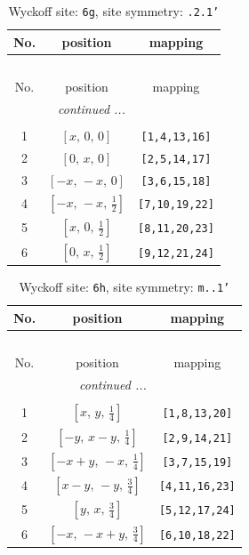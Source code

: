 \documentclass[fleqn,8pt]{jsarticle}
\begin{document}
\renewcommand{\arraystretch}{1.2}
\begin{longtable}{ccc}
\caption{Wyckoff site: {\tt 6g}, site symmetry: {\tt .2.1'}}
 \\
 \hline \hline
No. & position & mapping \\ \hline \endfirsthead

\multicolumn{2}{l}{\tablename\ \thetable{}} \\
 \hline \hline
No. & position & mapping \\ \hline \endhead

 \hline \hline
\multicolumn{2}{r}{\footnotesize\it continued ...} \\ \endfoot

 \hline \hline
\multicolumn{2}{r}{} \\ \endlastfoot

1 & $\left[ x,\, 0,\, 0 \right]$ & {\tt [1,4,13,16]} \\ \hline
2 & $\left[ 0,\, x,\, 0 \right]$ & {\tt [2,5,14,17]} \\ \hline
3 & $\left[ - x,\, - x,\, 0 \right]$ & {\tt [3,6,15,18]} \\ \hline
4 & $\left[ - x,\, - x,\, \frac{1}{2} \right]$ & {\tt [7,10,19,22]} \\ \hline
5 & $\left[ x,\, 0,\, \frac{1}{2} \right]$ & {\tt [8,11,20,23]} \\ \hline
6 & $\left[ 0,\, x,\, \frac{1}{2} \right]$ & {\tt [9,12,21,24]} \\
\end{longtable}
\renewcommand{\arraystretch}{1.2}
\begin{longtable}{ccc}
\caption{Wyckoff site: {\tt 6h}, site symmetry: {\tt m..1'}}
 \\
 \hline \hline
No. & position & mapping \\ \hline \endfirsthead

\multicolumn{2}{l}{\tablename\ \thetable{}} \\
 \hline \hline
No. & position & mapping \\ \hline \endhead

 \hline \hline
\multicolumn{2}{r}{\footnotesize\it continued ...} \\ \endfoot

 \hline \hline
\multicolumn{2}{r}{} \\ \endlastfoot

1 & $\left[ x,\, y,\, \frac{1}{4} \right]$ & {\tt [1,8,13,20]} \\ \hline
2 & $\left[ - y,\, x - y,\, \frac{1}{4} \right]$ & {\tt [2,9,14,21]} \\ \hline
3 & $\left[ - x + y,\, - x,\, \frac{1}{4} \right]$ & {\tt [3,7,15,19]} \\ \hline
4 & $\left[ x - y,\, - y,\, \frac{3}{4} \right]$ & {\tt [4,11,16,23]} \\ \hline
5 & $\left[ y,\, x,\, \frac{3}{4} \right]$ & {\tt [5,12,17,24]} \\ \hline
6 & $\left[ - x,\, - x + y,\, \frac{3}{4} \right]$ & {\tt [6,10,18,22]} \\
\end{longtable}
\end{document}
